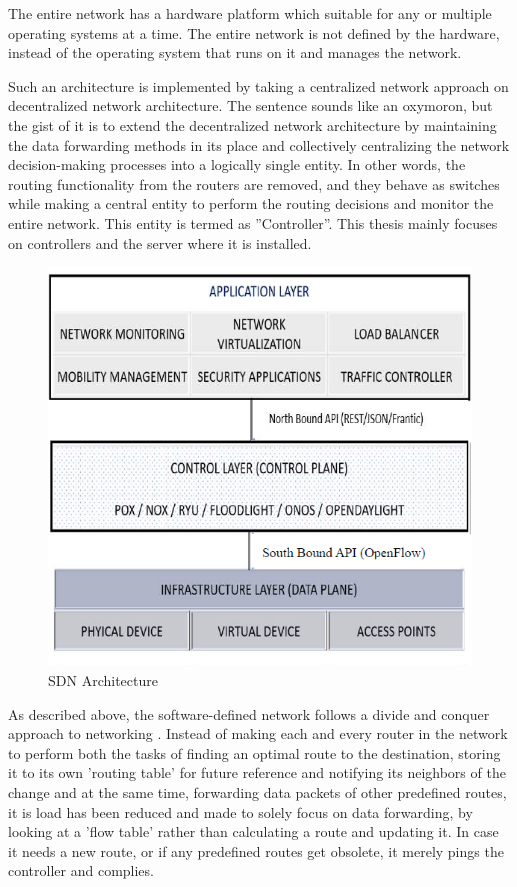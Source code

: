      The entire network has a hardware platform which suitable for any or multiple operating systems at a time. The entire network is not defined by the hardware, instead of the operating system that runs on it and manages the network.
    
    Such an architecture is implemented by taking a centralized network approach on decentralized network architecture. The sentence sounds like an oxymoron, but the gist of it is to extend the decentralized network architecture by maintaining the data forwarding methods in its place and collectively centralizing the network decision-making processes into a logically single entity. In other words, the routing functionality from the routers are removed, and they behave as switches while making a central entity to perform the routing decisions and monitor the entire network. This entity is termed as ''Controller''. This thesis mainly focuses on controllers and the server where it is installed.
    
\begin{figure}[!hbt]
    \centering
     \includegraphics[width=\textwidth,keepaspectratio]{images/SDN-architecture-example.png}
    \caption{SDN Architecture \cite{sdnimages}}
    \label{fig:SDN Architecure}
\end{figure}
    
    As described above, the software-defined network follows a divide and conquer approach to networking \cite{taxonomy2014}. Instead of making each and every router in the network to perform both the tasks of finding an optimal route to the destination, storing it to its own 'routing table' for future reference and notifying its neighbors of the change and at the same time, forwarding data packets of other predefined routes, it is load has been reduced and made to solely focus on data forwarding, by looking at a 'flow table' rather than calculating a route and updating it. In case it needs a new route, or if any predefined routes get obsolete, it merely pings the controller and complies.
    

